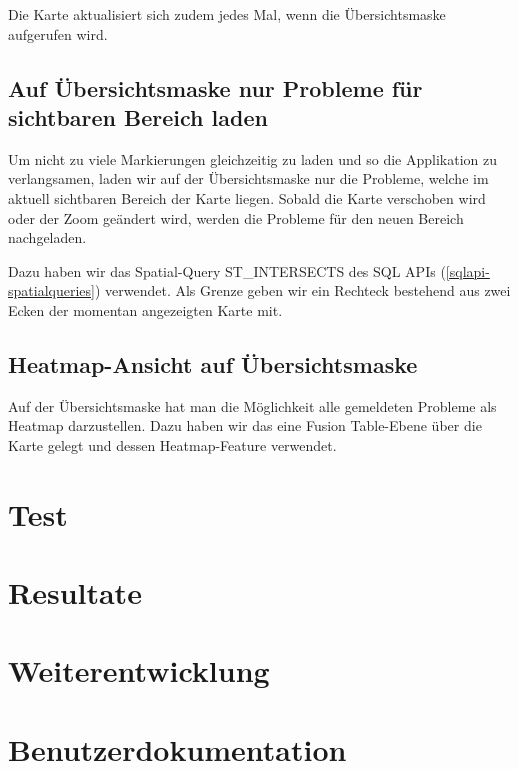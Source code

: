 Die Karte aktualisiert sich zudem jedes Mal, wenn die Übersichtsmaske aufgerufen wird.

\subsection{Auf Übersichtsmaske nur Probleme für sichtbaren Bereich laden}
Um nicht zu viele Markierungen gleichzeitig zu laden und so die Applikation zu verlangsamen, laden wir auf der Übersichtsmaske nur die Probleme, welche im aktuell sichtbaren Bereich der Karte liegen. Sobald die Karte verschoben wird oder der Zoom geändert wird, werden die Probleme für den neuen Bereich nachgeladen.

Dazu haben wir das Spatial-Query ST\_INTERSECTS des SQL APIs (\ref{sqlapi-spatialqueries}) verwendet. Als Grenze geben wir ein Rechteck bestehend aus zwei Ecken der momentan angezeigten Karte mit.

\subsection{Heatmap-Ansicht auf Übersichtsmaske}
Auf der Übersichtsmaske hat man die Möglichkeit alle gemeldeten Probleme als Heatmap darzustellen. Dazu haben wir das eine Fusion Table-Ebene über die Karte gelegt und dessen Heatmap-Feature verwendet. 

\section{Test}

\section{Resultate}

\section{Weiterentwicklung}

\section{Benutzerdokumentation}
